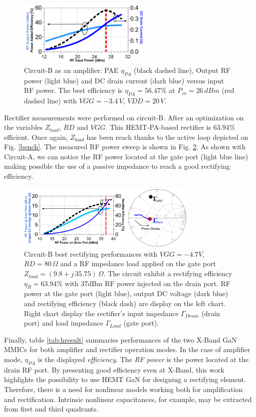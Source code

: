 \documentclass[conference]{IEEEtran}
\begin{document}
\begin{figure}[ht!] %
\centering
\includegraphics[width=2.5in]{IMS2014_Scott_Amplifier.pdf}
\caption{ Circuit-B as an amplifier:  PAE $\eta_{PA}$ (black dashed line), Output RF power (light blue) and DC drain current (dark blue) versus input RF power. The best efficiency is $\eta_{PA}=56.47\%$ at $P_{in}=26\,dBm$ (red dashed line) with $VGG=-3.4\,V$, $VDD=20\,V$.
 }
\label{scott_amp}
\end{figure}

Rectifier measurements were performed on circuit-B. After an optimization on the variables $Z_{load}$, $RD$ and $VGG$. This HEMT-PA-based rectifier is $63.94\%$ efficient. Once again, $Z_{load}$ has been reach thanks to the active loop depicted on Fig. \ref{bench}. The measured RF power sweep is shown in Fig. \ref{scott_rect}. As shown with Circuit-A, we can notice the RF power located at the gate port (light blue line) making possible the use of a passive impedance to reach a good rectifying efficiency.

\begin{figure}[ht!] %
\centering
\includegraphics[width=3.4in]{IMS2014_Scott_Rectifier.pdf}
\caption{ Circuit-B best rectifying performances with $VGG=-4.7V$, $RD=80\,\Omega$ and a RF impedance load applied on the gate port $Z_{load}=(9.8 + j\,35.75)\,\Omega$. The circuit exhibit a rectifying efficiency $\eta_R=63.94\%$ with 37dBm RF power injected on the drain port. RF power  at the gate port (light blue), output DC voltage (dark blue) and rectifying efficiency (black dash) are display on the left chart. Right chart display the rectifier's input impedance $\Gamma_{Drain}$ (drain port) and load impedance $\Gamma_{Load}$ (gate port).
 }
\label{scott_rect}
\end{figure}

Finally, table \ref{tab:hresult} summaries performances of the two X-Band GaN MMICs for both amplifier and rectifier operation modes. In the case of amplifier mode, $\eta_{PA}$ is the displayed \textit{efficiency}. The \textit{RF power} is the power located at the drain RF port.
By presenting good efficiency even at X-Band, this work highlights the possibility to use HEMT GaN for designing a rectifying element. Therefore, there is a need for nonlinear models working both for amplification and rectification. Intrinsic nonlinear capacitances, for example, may  be extracted from first and third quadrants.
\end{document}
